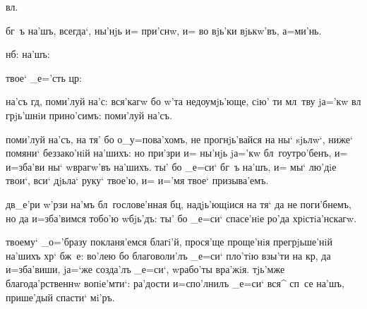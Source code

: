 




 вл.


 бг~ъ на'шъ, всегда`, ны'нjь и= при'снw, 
и= во вjь'ки вjькw'въ, а=ми'нь.


 нб:    на'шъ:

  твое` _е='сть цр:


 на'съ гд, поми'луй на'с\ъ: вся'кагw бо 
w'та недоумjь'юще, сiю' ти мл~тву jа='кw вл 
грjь'шнiи прино'симъ: поми'луй на'съ.

  поми'луй на'съ, на тя' бо 
о_у=пова'хомъ, не прогнjь'вайся на ны` sjьлw`, ниже` 
помяни` беззако'нiй на'шихъ: но при'зри и= ны'нjь jа='кw 
бл~гоутро'бенъ, и= и=зба'ви ны` w\т врагw'въ на'шихъ. ты' 
бо _е=си` бг~ъ на'шъ, и= мы` лю'дiе твои`, вси` дjьла` 
руку` твое'ю, и= и='мя твое` призыва'емъ.

   дв_е'ри w'рзи на'мъ 
бл~гослове'нная бц, надjь'ющiися на тя` да не 
поги'бнемъ, но да и=зба'вимся тобо'ю w\т бjь'дъ: ты' бо 
_е=си` спасе'нiе ро'да хрiстiа'нскагw.


 твоему` _о='бразу покланя'емся благi'й, 
прося'ще проще'нiя прегрjьше'нiй на'шихъ хр` бж~е: 
во'лею бо благоволи'лъ _е=си` пло'тiю взы'ти на кр, 
да и=зба'виши, jа=`же созда'лъ _е=си`, w\т рабо'ты 
вра'жiя. тjь'мже благода'рственнw вопiе'м\ъ ти`: ра'дости 
и=спо'лнилъ _е=си` вся^ сп~се на'шъ, прише'дый спасти` 
мi'ръ.

